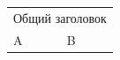 \documentclass{article}
\begin{document}
\begin{tabular}{ll}\multicolumn{2}{c}{Общий заголовок}\\ A & B\end{tabular}
\end{document}
